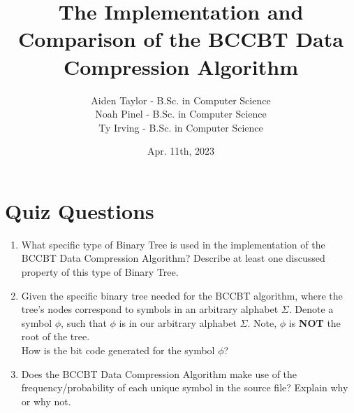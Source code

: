 \documentclass{beamer}
\newcommand{\Aiden}{Aiden Taylor - B.Sc. in Computer Science}
\newcommand{\Noah}{Noah Pinel - B.Sc. in Computer Science}
\newcommand{\Ty}{Ty Irving - B.Sc. in Computer Science}
\begin{document}
\title[CPSC 530]{The Implementation and Comparison of the BCCBT Data Compression Algorithm}
\author[Group 17]{
\begin{tabular}{l}
    \Aiden \\ \Noah\\ \Ty\\ 
\end{tabular}}
\date{Apr. 11th, 2023}

\begingroup
    \frame{\titlepage}
\endgroup

\begin{frame}
    \tableofcontents
\end{frame}

\section{Quiz Questions}
\begin{frame}
\begin{enumerate}[1.]
\item What specific type of Binary Tree is used in the implementation of the BCCBT Data Compression Algorithm?
Describe at least one discussed property of this type of Binary Tree.
\item Given the specific binary tree needed for the BCCBT algorithm, where the 
tree's nodes correspond to symbols in an arbitrary alphabet $\Sigma$.
Denote a symbol $\phi$, such that $\phi$ is in our arbitrary alphabet $\Sigma$.
Note, $\phi$ is \textbf{NOT} the root of the tree.\\
How is the bit code generated for the symbol $\phi$?
\item Does the BCCBT Data Compression Algorithm make use of the frequency/probability
of each unique symbol in the source file? Explain why or why not.
\end{enumerate}
\end{frame}
\end{document}
